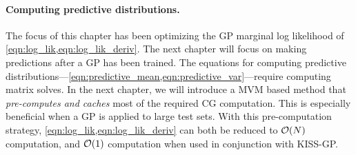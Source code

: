 \paragraph{Computing predictive distributions.}
The focus of this chapter has been optimizing the GP marginal log likelihood of \cref{eqn:log_lik,eqn:log_lik_deriv}.
The next chapter will focus on making predictions after a GP has been trained.
The equations for computing predictive distributions---\cref{eqn:predictive_mean,eqn:predictive_var}---require computing matrix solves.
In the next chapter, we will introduce a MVM based method that \emph{pre-computes and caches} most of the required CG computation.
This is especially beneficial when a GP is applied to large test sets.
With this pre-computation strategy, \cref{eqn:log_lik,eqn:log_lik_deriv} can both be reduced to $\bigo{N}$ computation, and $\bigo{1}$ computation when used in conjunction with KISS-GP.
